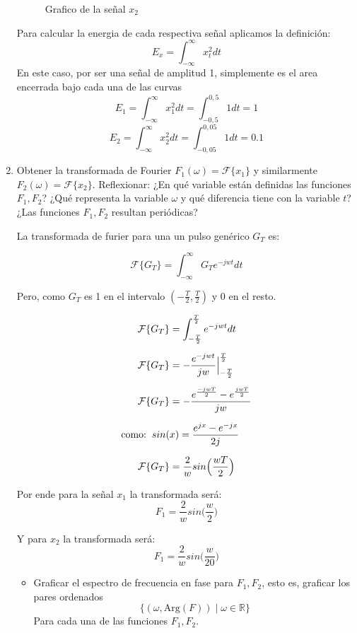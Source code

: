 \documentclass[12pt,a4paper]{report}
\begin{document}
\begin{enumerate}[label=\alph*),left=0pt]
\begin{figure}[h!]
\begin{minipage}{0.45\textwidth}
        \caption{Grafico de la señal $x_2$}
        \label{fig:imagen2}
      \end{minipage}
    \end{figure}

    Para calcular la energia de cada respectiva señal aplicamos la definición:
    $$E_x = \int_{-\infty}^{\infty}x_t^2dt$$
    En este caso, por ser una señal de amplitud 1, simplemente es el area encerrada bajo cada una de las curvas
    $$E_1 = \int_{-\infty}^{\infty}x_1^2dt= \int_{-0,5}^{0,5}1dt=1$$
    $$E_2 = \int_{-\infty}^{\infty}x_2^2dt= \int_{-0,05}^{0,05}1dt=0.1$$

  \item Obtener la transformada de Fourier $F_1(\omega) = \mathcal{F}\{x_1\}$ y similarmente $F_2(\omega) =
    \mathcal{F}\{x_2\}$. Reflexionar: ¿En qué variable están definidas las funciones $F_1, F_2$? 
    ¿Qué representa la variable $\omega$ y qué diferencia tiene con la variable $t$? 
    ¿Las funciones $F_1, F_2$ resultan periódicas?

    La transformada de furier para una un pulso genérico $G_T$ es:

    $$\mathcal{F}\{G_T\} = \int_{-\infty}^{\infty}G_T e^{-jwt}dt$$

    Pero, como $G_T$ es 1 en el intervalo $(-\frac{T}{2},\frac{T}{2})$ y 0 en el resto.

    $$
    \begin{aligned}
      \mathcal{F}\{G_T\} &= \int_{-\frac{T}{2}}^{\frac{T}{2}}e^{-jwt}dt \\[6pt]
      \mathcal{F}\{G_T\} &= -\frac{e^{-jwt}}{jw}\Big|^{\frac{T}{2}}_{-\frac{T}{2}} \\[6pt]
      \mathcal{F}\{G_T\} &= -\frac{e^{\frac{-jwT}{2}}-e^{\frac{jwT}{2}}}{jw}\\[6pt]
      \text{como:} \hspace{2mm} sin(&x)=\frac{e^{jx}-e^{-jx}}{2j}\\[6pt]
      \mathcal{F}\{G_T\} &= \frac{2}{w}sin\Big(\frac{wT}{2}\Big)
    \end{aligned}
    $$

    Por ende para la señal $x_1$ la transformada será:
    $$F_1= \frac{2}{w}sin\Big(\frac{w}{2}\Big)$$

    Y para $x_2$ la transformada será:
    $$F_1= \frac{2}{w}sin\Big(\frac{w}{20}\Big)$$

    \begin {itemize}[left=0pt]

      \item Graficar el espectro de frecuencia en fase para $F_1, F_2$, esto es, graficar los pares ordenados
        $$\{(\omega, \text{Arg}(F)) \mid \omega \in \mathbb{R}\}$$
        Para cada una de las funciones $F_1, F_2$.\newline


\end{itemize}
\end{enumerate}
\end{document}
